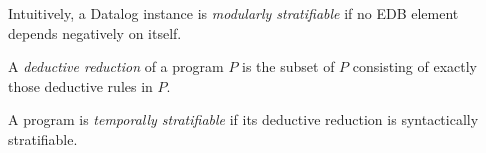 Intuitively, a Datalog instance is {\em modularly stratifiable} if no EDB
element depends negatively on itself.


%
%

%

%
%

%
%


\begin{definition}
%
A \emph{deductive reduction} of a \slang program $P$ is the subset of $P$
consisting of exactly those deductive rules in $P$.
%
\end{definition}

\begin{definition} 
%
A \slang program is \emph{temporally stratifiable} if its deductive
reduction is syntactically stratifiable.
%
\end{definition}

